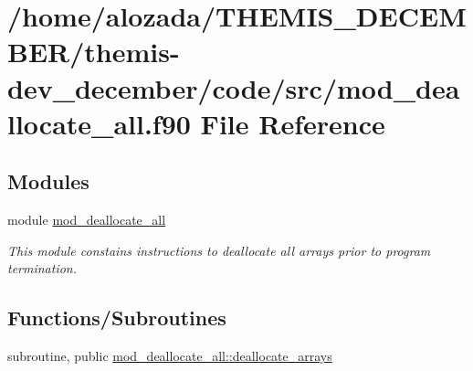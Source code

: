 \hypertarget{mod__deallocate__all_8f90}{}\section{/home/alozada/\+T\+H\+E\+M\+I\+S\+\_\+\+D\+E\+C\+E\+M\+B\+E\+R/themis-\/dev\+\_\+december/code/src/mod\+\_\+deallocate\+\_\+all.f90 File Reference}
\label{mod__deallocate__all_8f90}
\subsection*{Modules}
\begin{DoxyCompactItemize}
\item 
module \hyperlink{namespacemod__deallocate__all}{mod\+\_\+deallocate\+\_\+all}
\begin{DoxyCompactList}\small\item\em This module constains instructions to deallocate all arrays prior to program termination. \end{DoxyCompactList}\end{DoxyCompactItemize}
\subsection*{Functions/\+Subroutines}
\begin{DoxyCompactItemize}
\item 
subroutine, public \hyperlink{namespacemod__deallocate__all_a03994854d5404353882da36b59ca3098}{mod\+\_\+deallocate\+\_\+all\+::deallocate\+\_\+arrays}
\end{DoxyCompactItemize}
